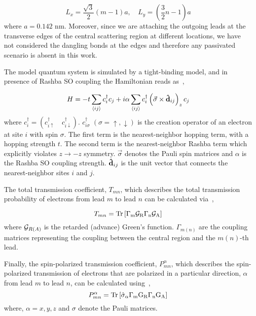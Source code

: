 \documentclass[prb,aps,twocolumn,amsmath,amssymb,floatfix,
superscriptaddress]{revtex4}
\begin{document}
\begin{equation}
L_x = \frac{\sqrt{3}}{2}(m-1)a,\quad L_y = \left(\frac{3}{2}n-1\right)a
\label{dim_cal}
\end{equation}
where $a=0.142$ nm. Moreover, since we are attaching the outgoing
  leads at the transverse edges of the central scattering region at
  different locations, we have not considered the dangling bonds at the
  edges and therefore any passivated scenario is absent in this work.

The model quantum system is simulated by a tight-binding model, and in
presence of Rashba SO coupling the Hamiltonian reads
as~\cite{km1,km2},

\begin{equation}
H= - t\sum\limits_{\langle ij\rangle}c_i^{\dagger} c_j +
i\alpha\sum\limits_{\langle ij\rangle}c_i^{\dagger} \left(
\vec{\sigma} \times {\bf\hat{d}}_{ij}\right)_z c_j
\label{h2}
\end{equation} 
where $c_i^{\dagger}=\left(c_{i\uparrow}^{\dagger} \quad
c_{i\downarrow}^{\dagger}\right)$. $c_{i\sigma}^{\dagger}$
$(\sigma=\uparrow,\downarrow)$ is the creation operator of an electron
at site $i$ with spin $\sigma$. The first term is the nearest-neighbor
hopping term, with a hopping strength $t$. The second term is the
nearest-neighbor Rashba term which explicitly violates $z\rightarrow
-z$ symmetry. $\vec{\sigma}$ denotes the Pauli spin matrices and
$\alpha$ is the Rashba SO coupling strength. ${\bf\hat{d}}_{ij}$ is
the unit vector that connects the nearest-neighbor sites $i$ and $j$.

The total transmission coefficient, $T_{mn}$, which describes the
total transmission probability of electrons from lead $m$ to lead $n$
can be calculated via~\cite{caroli,Fisher-Lee,dutta},

\begin{equation}
T_{mn} = \rm{Tr}\left[\Gamma_m {\cal G}_R
  \Gamma_n {\cal G}_A\right]
\end{equation}
where ${\cal G}_{R(A)}$ is the retarded (advance) Green's
function. $\Gamma_{m(n)}$ are the coupling matrices representing the
coupling between the central region and the $m(n)$-th lead.

Finally, the spin-polarized transmission coefficient, $P^\alpha_{mn}$,
which describes the spin-polarized transmission of electrons that are
polarized in a particular direction, $\alpha$ from lead $m$ to lead
$n$, can be calculated using~\cite{chang},
\begin{equation}
P^\alpha_{mn} = \rm{Tr}\left[\hat{\sigma}_\alpha\Gamma_m G_R
  \Gamma_n G_A\right]
\label{p-alpha-def}
\end{equation}
where, $\alpha=x,y,z$ and $\sigma$ denote the Pauli matrices.
\end{document}
